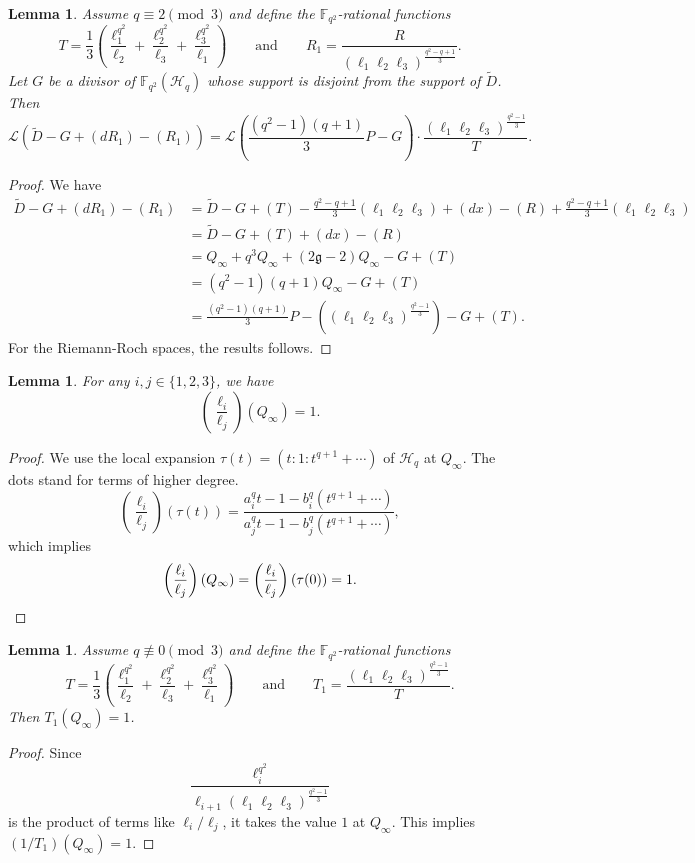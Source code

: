 \documentclass[11pt]{amsart}
\theoremstyle{plain}
\newtheorem{lemma}[theorem]{Lemma}
\theoremstyle{definition}
\theoremstyle{remark}
\newcommand{\g}{\mathfrak{g}}
\begin{document}
\begin{lemma} \label{lm:tildeD-riemann-roch}
Assume $q\equiv 2 \pmod3$ and define the $\mathbb{F}_{q^2}$-rational functions 
\[T=\frac{1}{3}\left(\frac{\ell_1^{q^2}}{\ell_2} + \frac{\ell_2^{q^2}}{\ell_3} + \frac{\ell_3^{q^2}}{\ell_1}\right) \qquad \text{and} \qquad R_1=\frac{R}{(\ell_1\ell_{2}\ell_{3})^{\frac{q^2-q+1}{3}}}.\]
Let $G$ be a divisor of $\mathbb{F}_{q^2}(\mathscr{H}_q)$ whose support is disjoint from the support of $\widetilde{D}$. Then
\[\mathscr{L}(\widetilde{D}-G+(dR_1)-(R_1)) = \mathscr{L}\left( \frac{(q^2-1)(q+1)}{3} P -  G\right) \cdot \frac{(\ell_1\ell_{2}\ell_{3})^{\frac{q^2-1}{3}}}{T}.\]
\end{lemma}
\begin{proof}
We have
\begin{align*}
\widetilde{D}-G+(dR_1)-(R_1) &= \widetilde{D}-G+(T)-\frac{q^2-q+1}{3}(\ell_1\ell_2\ell_3)+(dx)-(R)+\frac{q^2-q+1}{3}(\ell_1\ell_2\ell_3) \\
&= \widetilde{D}-G+(T)+(dx)-(R)\\
&= Q_\infty + q^3 Q_\infty +(2\g-2)Q_\infty-G+(T)\\
&= (q^2-1)(q+1)Q_\infty -G+(T)\\
&= \frac{(q^2-1)(q+1)}{3}P-\left((\ell_1\ell_{2}\ell_{3})^{\frac{q^2-1}{3}}\right) -G+(T).
\end{align*}
For the Riemann-Roch spaces, the results follows. 
\end{proof}

\begin{lemma} \label{lm:elliellj-at-Qinfty}
For any $i,j\in \{1,2,3\}$, we have
\[\left(\frac{\ell_i}{\ell_j}\right)(Q_\infty)=1.\]
\end{lemma}
\begin{proof}
We use the local expansion $\tau(t)=(t:1:t^{q+1}+\cdots)$ of $\mathscr{H}_q$ at $Q_\infty$. The dots stand for terms of higher degree. 
\[\left(\frac{\ell_i}{\ell_j}\right)(\tau(t)) = \frac{a_i^qt -1 -b_i^q(t^{q+1}+\cdots)}{a_j^qt -1 -b_j^q(t^{q+1}+\cdots)},\] 
which implies 
\[\left(\frac{\ell_i}{\ell_j}\right)(Q_\infty) = \left(\frac{\ell_i}{\ell_j}\right)(\tau(0)) =1. \qedhere\]
\end{proof}

\begin{lemma} \label{lm:T1-at-Qinfty}
Assume $q\not\equiv 0 \pmod3$ and define the $\mathbb{F}_{q^2}$-rational functions 
\[T=\frac{1}{3}\left(\frac{\ell_1^{q^2}}{\ell_2} + \frac{\ell_2^{q^2}}{\ell_3} + \frac{\ell_3^{q^2}}{\ell_1}\right) \qquad \text{and} \qquad T_1=\frac{(\ell_1\ell_{2}\ell_{3})^{\frac{q^2-1}{3}}}{T}.\]
Then $T_1(Q_\infty)=1$. 
\end{lemma}
\begin{proof}
Since 
\[\frac{\ell_i^{q^2}}{\ell_{i+1}(\ell_1\ell_{2}\ell_{3})^{\frac{q^2-1}{3}}}\]
is the product of terms like $\ell_i/\ell_j$, it takes the value $1$ at $Q_\infty$. This implies $(1/T_1)(Q_\infty)=1$. 
\end{proof}
\end{document}
